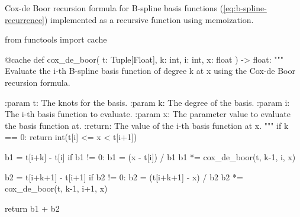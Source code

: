 \begin{algorithm}
\caption{Cox-de Boor recursion formula for B-spline basis functions (\cref{eq:b-spline-recurrence}) implemented as a recursive function using memoization.}
\label{alg:cox-de-boor}
\begin{python}
from functools import cache


@cache
def cox_de_boor(
    t: Tuple[Float], k: int, i: int, x: float
) -> float:
    """
    Evaluate the i-th B-spline basis function of degree k at x
    using the Cox-de Boor recursion formula.

    :param t: The knots for the basis.
    :param k: The degree of the basis.
    :param i: The i-th basis function to evaluate.
    :param x: The parameter value to evaluate the basis function at.
    :return: The value of the i-th basis function at x.
    """
    if k == 0:
        return int(t[i] <= x < t[i+1])

    b1 = t[i+k] - t[i]
    if b1 != 0:
        b1 = (x - t[i]) / b1
        b1 *= cox_de_boor(t, k-1, i, x)

    b2 = t[i+k+1] - t[i+1]
    if b2 != 0:
        b2 = (t[i+k+1] - x) / b2
        b2 *= cox_de_boor(t, k-1, i+1, x)

    return b1 + b2
\end{python}
\end{algorithm}